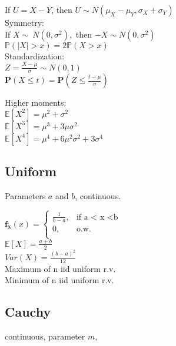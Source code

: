 If $U = X - Y$, then $U \sim N(\mu_X - \mu_Y,\sigma_X + \sigma_Y)$\\

Symmetry:\\

If $X \sim\ N(0,\sigma^2),$ then $-X \sim N(0,\sigma^2)$\\

$\mathbb{P}(|X|>x) = 2\mathbb{P}(X>x)$\\

Standardization:\\

$Z= \frac{X-\mu}{\sigma} \sim N(0,1)$\\

$\mathbf{P}\left(X\leq t\right) = \displaystyle \mathbf{P}\left(Z\leq \frac{t-\mu}{\sigma}\right)$

Higher moments:\\

$\mathbb{E}[X^2] = \mu^2 + \sigma^2$\\
$\mathbb{E}[X^3] = \mu^3 + 3\mu\sigma^2$\\
$\mathbb{E}[X^4] = \mu^4 + 6\mu^2\sigma^2 +3\sigma^4$\\



\subsection*{Uniform}

Parameters $a$ and $b$, continuous.

$ \mathbf{f_x}(x)=
	\begin{cases}
		 \frac{1}{b-a},&\text{if a < x <b}\\
		0,&\text{o.w.}\\
	\end{cases}
$\\

$\mathbb{E}[X]=\frac{a+b}{2}$\\
$Var(X)=\frac{(b-a)^2}{12}$\\

Maximum of n iid uniform r.v.\\

Minimum of n iid uniform r.v.\\

\subsection*{Cauchy}
continuous, parameter $m$,

